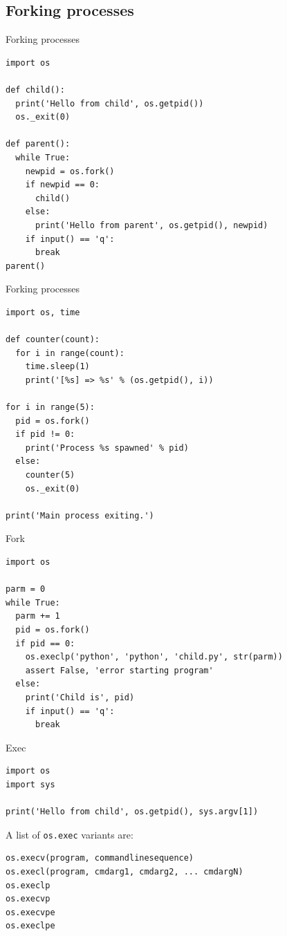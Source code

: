 \documentclass[xcolor=dvipsnames, 10pt, presentation,aspectratio=169]{beamer}
\begin{document}
\subsection{Forking processes}
\label{sec:orge775c52}
\begin{frame}[label={sec:org13ef7ed},fragile]{Forking processes}
 \lstset{language=Python,label= ,caption= ,captionpos=b,numbers=none}
\begin{lstlisting}
import os

def child():
  print('Hello from child', os.getpid())
  os._exit(0)

def parent():
  while True:
    newpid = os.fork()
    if newpid == 0:
      child()
    else:
      print('Hello from parent', os.getpid(), newpid)
    if input() == 'q':
      break
parent()
\end{lstlisting}
\end{frame}
\begin{frame}[label={sec:orgd675987},fragile]{Forking processes}
 \lstset{language=Python,label= ,caption= ,captionpos=b,numbers=none}
\begin{lstlisting}
import os, time

def counter(count):
  for i in range(count):
    time.sleep(1)
    print('[%s] => %s' % (os.getpid(), i))

for i in range(5):
  pid = os.fork()
  if pid != 0:
    print('Process %s spawned' % pid)
  else:
    counter(5)
    os._exit(0)

print('Main process exiting.')
\end{lstlisting}
\end{frame}
\begin{frame}[label={sec:orgaeeb646},fragile]{Fork}
 \lstset{language=Python,label= ,caption= ,captionpos=b,numbers=none}
\begin{lstlisting}
import os

parm = 0
while True:
  parm += 1
  pid = os.fork()
  if pid == 0:
    os.execlp('python', 'python', 'child.py', str(parm))
    assert False, 'error starting program'
  else:
    print('Child is', pid)
    if input() == 'q':
      break
\end{lstlisting}
\end{frame}
\begin{frame}[label={sec:orgdd8ec73},fragile]{Exec}
 \lstset{language=Python,label= ,caption= ,captionpos=b,numbers=none}
\begin{lstlisting}
import os
import sys

print('Hello from child', os.getpid(), sys.argv[1])
\end{lstlisting}

A list of \texttt{os.exec} variants are:
\begin{verbatim}
os.execv(program, commandlinesequence)
os.execl(program, cmdarg1, cmdarg2, ... cmdargN)
os.execlp
os.execvp
os.execvpe
os.execlpe
\end{verbatim}
\end{frame}
\end{document}
